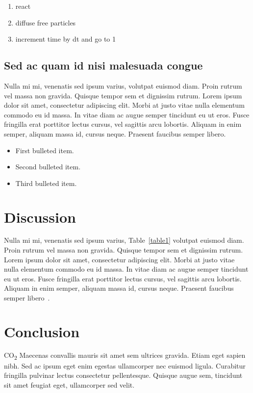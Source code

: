 \documentclass[10pt,letterpaper]{article}
\begin{document}
\begin{enumerate}
	\item{react}
	\item{diffuse free particles}
	\item{increment time by dt and go to 1}
\end{enumerate}


\subsection*{Sed ac quam id nisi malesuada congue}

Nulla mi mi, venenatis sed ipsum varius, volutpat euismod diam. Proin rutrum vel massa non gravida. Quisque tempor sem et dignissim rutrum. Lorem ipsum dolor sit amet, consectetur adipiscing elit. Morbi at justo vitae nulla elementum commodo eu id massa. In vitae diam ac augue semper tincidunt eu ut eros. Fusce fringilla erat porttitor lectus cursus, vel sagittis arcu lobortis. Aliquam in enim semper, aliquam massa id, cursus neque. Praesent faucibus semper libero.

\begin{itemize}
	\item First bulleted item.
	\item Second bulleted item.
	\item Third bulleted item.
\end{itemize}

\section*{Discussion}
Nulla mi mi, venenatis sed ipsum varius, Table~\ref{table1} volutpat euismod diam. Proin rutrum vel massa non gravida. Quisque tempor sem et dignissim rutrum. Lorem ipsum dolor sit amet, consectetur adipiscing elit. Morbi at justo vitae nulla elementum commodo eu id massa. In vitae diam ac augue semper tincidunt eu ut eros. Fusce fringilla erat porttitor lectus cursus, vel sagittis arcu lobortis. Aliquam in enim semper, aliquam massa id, cursus neque. Praesent faucibus semper libero~\cite{bib3}.

\section*{Conclusion}

CO\textsubscript{2} Maecenas convallis mauris sit amet sem ultrices gravida. Etiam eget sapien nibh. Sed ac ipsum eget enim egestas ullamcorper nec euismod ligula. Curabitur fringilla pulvinar lectus consectetur pellentesque. Quisque augue sem, tincidunt sit amet feugiat eget, ullamcorper sed velit. 
\end{document}
